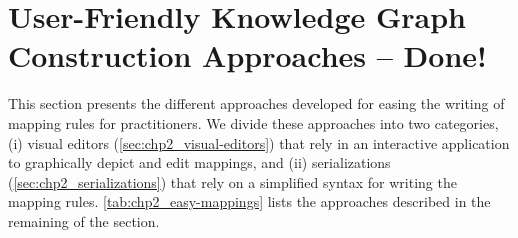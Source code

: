 \section{User-Friendly Knowledge Graph Construction Approaches \textcolor{shamrockgreen}{-- Done!}}
\label{sec:chp2_easy_kgc}

This section presents the different approaches developed for easing the writing of mapping rules for practitioners. We divide these approaches into two categories, (i) visual editors (\cref{sec:chp2_visual-editors}) that rely in an interactive application to graphically depict and edit mappings, and (ii) serializations (\cref{sec:chp2_serializations}) that rely on a simplified syntax for writing the mapping rules. \cref{tab:chp2_easy-mappings} lists the approaches described in the remaining of the section.

